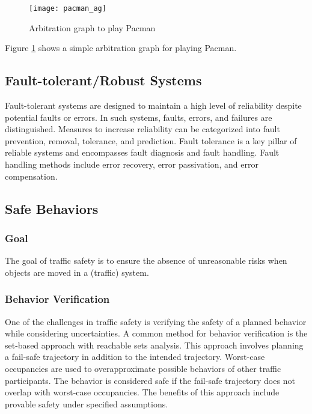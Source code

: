\begin{figure}
  \centering
  \texttt{[image: pacman\_ag]}

  \caption{Arbitration graph to play Pacman}%
  \label{fig:pacman_ag}
\end{figure}

Figure \ref{fig:pacman_ag} shows a simple arbitration graph for playing Pacman.

\subsection{Fault-tolerant/Robust Systems}

Fault-tolerant systems are designed to maintain a high level of reliability despite potential faults or errors. In such systems, faults, errors, and failures are distinguished. Measures to increase reliability can be categorized into fault prevention, removal, tolerance, and prediction. Fault tolerance is a key pillar of reliable systems and encompasses fault diagnosis and fault handling. Fault handling methods include error recovery, error passivation, and error compensation.

\subsection{Safe Behaviors}

\subsubsection*{Goal}
The goal of traffic safety is to ensure the absence of unreasonable risks when objects are moved in a (traffic) system.

\subsubsection*{Behavior Verification}
One of the challenges in traffic safety is verifying the safety of a planned behavior while considering uncertainties. A common method for behavior verification is the set-based approach with reachable sets analysis. This approach involves planning a fail-safe trajectory in addition to the intended trajectory. Worst-case occupancies are used to overapproximate possible behaviors of other traffic participants. The behavior is considered safe if the fail-safe trajectory does not overlap with worst-case occupancies. The benefits of this approach include provable safety under specified assumptions.

